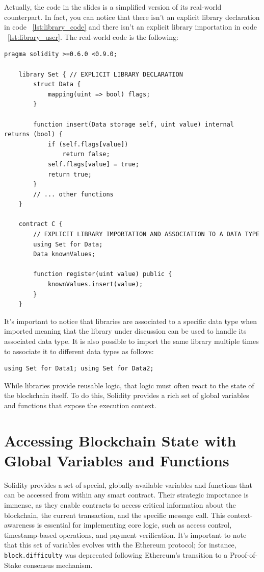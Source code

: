 \documentclass{scrbook}
\begin{document}
Actually, the code in the slides is a simplified version of its real-world counterpart. In fact, you can notice that there isn't an explicit library declaration in code ~\ref{lst:library_code} and there isn't an explicit library importation in code ~\ref{lst:library_user}. The real-world code is the following:

\begin{lstlisting}[caption={Real world library declaration and usage}]
    pragma solidity >=0.6.0 <0.9.0;

    library Set { // EXPLICIT LIBRARY DECLARATION
        struct Data {
            mapping(uint => bool) flags;
        }
        
        function insert(Data storage self, uint value) internal returns (bool) {
            if (self.flags[value])
                return false;
            self.flags[value] = true;
            return true;
        }
        // ... other functions
    }
    
    contract C {
        // EXPLICIT LIBRARY IMPORTATION AND ASSOCIATION TO A DATA TYPE
        using Set for Data;
        Data knownValues;
        
        function register(uint value) public {
            knownValues.insert(value);
        }
    }
\end{lstlisting}

It's important to notice that libraries are associated to a specific data type when imported meaning that the library under discussion can be used to handle its associated data type. It is also possible to import the same library multiple times to associate it to different data types as follows:

\begin{lstlisting}[caption={Importing the same library multiple times to associate it to different data types}]
    using Set for Data1; using Set for Data2;
\end{lstlisting}

While libraries provide reusable logic, that logic must often react to the state of the blockchain itself. To do this, Solidity provides a rich set of global variables and functions that expose the execution context.

\chapter{Accessing Blockchain State with Global Variables and Functions}

Solidity provides a set of special, globally-available variables and functions that can be accessed from within any smart contract. Their strategic importance is immense, as they enable contracts to access critical information about the blockchain, the current transaction, and the specific message call. This context-awareness is essential for implementing core logic, such as access control, timestamp-based operations, and payment verification. It's important to note that this set of variables evolves with the Ethereum protocol; for instance, \texttt{block.difficulty} was deprecated following Ethereum's transition to a Proof-of-Stake consensus mechanism.\\
\end{document}
